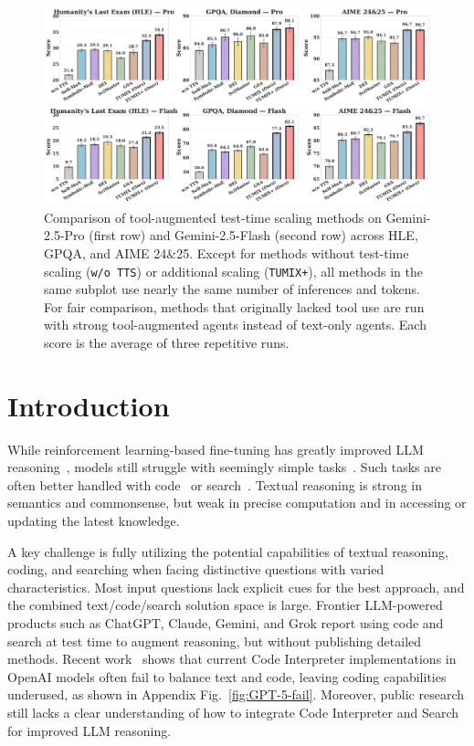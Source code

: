 
\begin{figure}[ht]
  \centering 
  \includegraphics[width=0.95\linewidth]{Figures/tumix_benchmarks_2x3.pdf}
   \caption{Comparison of tool-augmented test-time scaling methods on Gemini-2.5-Pro (first row) and Gemini-2.5-Flash (second row) across HLE, GPQA, and AIME 24\&25. Except for methods without test-time scaling (\texttt{w/o TTS}) or additional scaling (\texttt{TUMIX+}), all methods in the same subplot use nearly the same number of inferences and tokens. For fair comparison, methods that originally lacked tool use are run with strong tool-augmented agents instead of text-only agents. Each score is the average of three repetitive runs.}
   \label{fig:summary_results}
   \vspace{-12pt}
\end{figure}

\section{Introduction}
While reinforcement learning-based fine-tuning has greatly improved LLM reasoning~\citep{deepseek-r1}, models still struggle with seemingly simple tasks~\citep{codesteering}. 
Such tasks are often better handled with code~\citep{llm+code=commense-learner,Program-of-thoughts-prompting} or search~\citep{search-r1,Search-O1}. 
Textual reasoning is strong in semantics and commonsense, but weak in precise computation and in accessing or updating the latest knowledge.

A key challenge is fully utilizing the potential capabilities of textual reasoning, coding, and searching when facing distinctive questions with varied characteristics. Most input questions lack explicit cues for the best approach, and the combined text/code/search solution space is large. Frontier LLM-powered products such as ChatGPT, Claude, Gemini, and Grok report using code and search at test time to augment reasoning, but without publishing detailed methods. Recent work~\citep{codesteering} shows that current Code Interpreter implementations in OpenAI models often fail to balance text and code, leaving coding capabilities underused, as shown in Appendix Fig.~\ref{fig:GPT-5-fail}. Moreover, public research still lacks a clear understanding of how to integrate Code Interpreter and Search for improved LLM reasoning.

